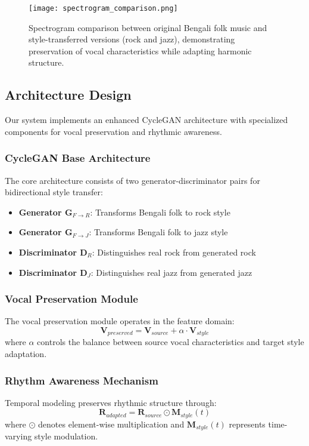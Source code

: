 \documentclass[conference]{IEEEtran}
\begin{document}
\begin{figure}[!htbp]
\centering
\texttt{[image: spectrogram\_comparison.png]}
\caption{Spectrogram comparison between original Bengali folk music and style-transferred versions (rock and jazz), demonstrating preservation of vocal characteristics while adapting harmonic structure.}
\label{fig:spectrogram_comparison}
\end{figure}

\subsection{Architecture Design}
Our system implements an enhanced CycleGAN architecture with specialized components for vocal preservation and rhythmic awareness.

\subsubsection{CycleGAN Base Architecture}
The core architecture consists of two generator-discriminator pairs for bidirectional style transfer:
\begin{itemize}
\item \textbf{Generator G$_{F\rightarrow R}$}: Transforms Bengali folk to rock style
\item \textbf{Generator G$_{F\rightarrow J}$}: Transforms Bengali folk to jazz style
\item \textbf{Discriminator D$_R$}: Distinguishes real rock from generated rock
\item \textbf{Discriminator D$_J$}: Distinguishes real jazz from generated jazz
\end{itemize}

\subsubsection{Vocal Preservation Module}
The vocal preservation module operates in the feature domain:
\begin{equation}
\mathbf{V}_{preserved} = \mathbf{V}_{source} + \alpha \cdot \mathbf{V}_{style}
\label{eq:vocal_preserve}
\end{equation}
where $\alpha$ controls the balance between source vocal characteristics and target style adaptation.

\subsubsection{Rhythm Awareness Mechanism}
Temporal modeling preserves rhythmic structure through:
\begin{equation}
\mathbf{R}_{adapted} = \mathbf{R}_{source} \odot \mathbf{M}_{style}(t)
\label{eq:rhythm_adapt}
\end{equation}
where $\odot$ denotes element-wise multiplication and $\mathbf{M}_{style}(t)$ represents time-varying style modulation.
\end{document}
